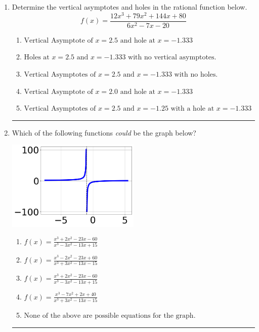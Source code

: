 \documentclass[14pt]{extbook}
\newcommand{\litem}[1]{\item#1\hspace*{-1cm}\rule{\textwidth}{0.4pt}}
\begin{document}
\begin{enumerate}
{\begin{enumerate}[label=\Alph*.]
\end{enumerate} }
\litem{
Determine the vertical asymptotes and holes in the rational function below.\[ f(x) = \frac{12x^{3} +79 x^{2} +144 x + 80}{6x^{2} -7 x -20} \]\begin{enumerate}[label=\Alph*.]
\item \( \text{Vertical Asymptote of } x = 2.5 \text{ and hole at } x = -1.333 \)
\item \( \text{Holes at } x = 2.5 \text{ and } x = -1.333 \text{ with no vertical asymptotes.} \)
\item \( \text{Vertical Asymptotes of } x = 2.5 \text{ and } x = -1.333 \text{ with no holes.} \)
\item \( \text{Vertical Asymptote of } x = 2.0 \text{ and hole at } x = -1.333 \)
\item \( \text{Vertical Asymptotes of } x = 2.5 \text{ and } x = -1.25 \text{ with a hole at } x = -1.333 \)

\end{enumerate} }
\litem{
Which of the following functions \textit{could} be the graph below?
\begin{center}
    \includegraphics[width=0.5\textwidth]{../Figures/identifyGraphOfRationalFunctionCopyB.png}
\end{center}
\begin{enumerate}[label=\Alph*.]
\item \( f(x)=\frac{x^{3} +2 x^{2} -23 x -60}{x^{3} -3 x^{2} -13 x + 15} \)
\item \( f(x)=\frac{x^{3} -2 x^{2} -23 x + 60}{x^{3} +3 x^{2} -13 x -15} \)
\item \( f(x)=\frac{x^{3} +2 x^{2} -23 x -60}{x^{3} -3 x^{2} -13 x + 15} \)
\item \( f(x)=\frac{x^{3} -7 x^{2} +2 x + 40}{x^{3} +3 x^{2} -13 x -15} \)
\item \( \text{None of the above are possible equations for the graph.} \)


\end{enumerate}}
\end{enumerate}
\end{document}
